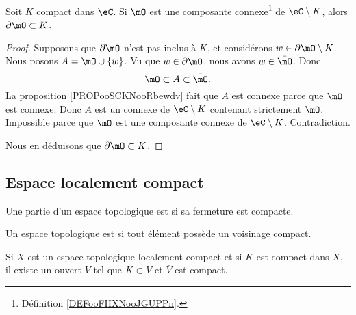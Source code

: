 \begin{proposition}       \label{PROPooOXKSooEDzCRZ}
	Soit \( K\) compact dans \( \eC\). Si \( \mO\) est une composante connexe\footnote{Définition \ref{DEFooFHXNooJGUPPn}.} de \( \eC\setminus K\), alors \( \partial \mO\subset K\).
\end{proposition}

\begin{proof}
	Supposons que \( \partial\mO\) n'est pas inclus à \( K\), et considérons \( w\in\partial\mO\setminus K\). Nous posons \( A=\mO\cup\{ w \}\). Vu que \( w\in\partial\mO\), nous avons \( w\in\bar\mO\). Donc
	\begin{equation}
		\mO\subset A\subset\bar\mO.
	\end{equation}
	La proposition \ref{PROPooSCKNooRbewdv} fait que \( A\) est connexe parce que \( \mO\) est connexe. Donc \( A\) est un connexe de \( \eC\setminus K\) contenant strictement \( \mO\). Impossible parce que \( \mO\) est une composante connexe de \( \eC\setminus K\). Contradiction.

	Nous en déduisons que \( \partial\mO\subset K\).
\end{proof}

\subsection{Espace localement compact}

\begin{definition}      \label{DEFooBODRooEFhzeT}
	Une partie d'un espace topologique est  si sa fermeture  est compacte.
\end{definition}

\begin{definition}  \label{DefEIBYooAWoESf}
	Un espace topologique est  si tout élément possède un voisinage compact.
\end{definition}

\begin{lemma}       \label{LEMooAXESooYvyesg}
	Si \( X\) est un espace topologique localement compact et si \( K\) est compact dans \( X\), il existe un ouvert \( V\) tel que \( K\subset V\) et \( \bar V\) est compact.
\end{lemma}

